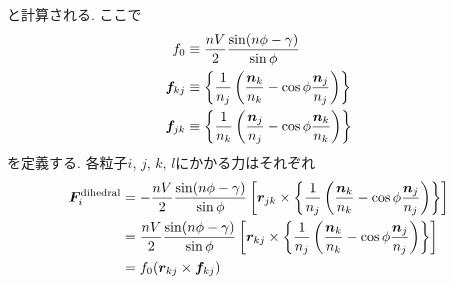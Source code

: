 と計算される. ここで
\begin{align}
   f_{0}
   &\equiv
   \frac{nV}{2}
   \frac{\sin(n\phi - \gamma)}{\sin \phi}
   \notag \\
   \bm{f}_{kj}
   &\equiv
   \left\{
      \frac{1}{n_{j}}
      \left(
             \frac{\bm{n}_{k}}{n_{k}} - \cos\phi \frac{\bm{n}_{j}}{n_{j}}
      \right)
   \right\}
   \notag \\
   \bm{f}_{jk}
   &\equiv
   \left\{
      \frac{1}{n_{k}}
      \left(
             \frac{\bm{n}_{j}}{n_{j}} - \cos\phi \frac{\bm{n}_{k}}{n_{k}}
      \right)
   \right\}
   \notag
\end{align}
を定義する. 各粒子$i$, $j$, $k$, $l$にかかる力はそれぞれ
\begin{align}
   \bm{F}_{i}^{\mathrm{dihedral}}
 &=
   -\frac{nV}{2} \frac{\sin(n\phi - \gamma)}{\sin{\phi}}
    \left[
              \bm{r}_{jk} \times
     \left\{
            \frac{1}{n_{j}}
            \left(
                   \frac{\bm{n}_{k}}{n_{k}} - \cos\phi \frac{\bm{n}_{j}}{n_{j}}
            \right)
     \right\}
    \right]
 \notag
 \\
 &=
   \frac{nV}{2} \frac{\sin(n\phi - \gamma)}{\sin{\phi}}
   \left[
              \bm{r}_{kj} \times
     \left\{
            \frac{1}{n_{j}}
            \left(
                   \frac{\bm{n}_{k}}{n_{k}} - \cos\phi \frac{\bm{n}_{j}}{n_{j}}
            \right)
     \right\}
   \right]
 \notag
 \\
 &=
  f_{0} (\bm{r}_{kj} \times \bm{f}_{kj})
 \notag
\end{align}

